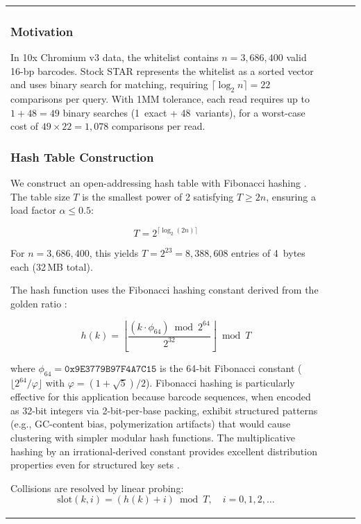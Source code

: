 \documentclass[11pt,twocolumn]{article}
\begin{document}
\begin{table}[t]
\begin{tabular}{@{}lrrr@{}}
\subsubsection{Motivation}

In 10x Chromium v3 data, the whitelist contains $n = 3{,}686{,}400$ valid 16-bp barcodes. Stock STAR represents the whitelist as a sorted vector and uses binary search for matching, requiring $\lceil \log_2 n \rceil = 22$ comparisons per query. With 1MM tolerance, each read requires up to $1 + 48 = 49$ binary searches (1~exact + 48~variants), for a worst-case cost of $49 \times 22 = 1{,}078$ comparisons per read.

\subsubsection{Hash Table Construction}

We construct an open-addressing hash table with Fibonacci hashing \citep{knuth1997art}. The table size $T$ is the smallest power of 2 satisfying $T \geq 2n$, ensuring a load factor $\alpha \leq 0.5$:

\begin{equation}
T = 2^{\lceil \log_2(2n) \rceil}
\label{eq:tablesize}
\end{equation}

For $n = 3{,}686{,}400$, this yields $T = 2^{23} = 8{,}388{,}608$ entries of 4~bytes each (32\,MB total).

The hash function uses the Fibonacci hashing constant derived from the golden ratio \citep{knuth1997art}:

\begin{equation}
h(k) = \left\lfloor \frac{(k \cdot \phi_{64}) \bmod 2^{64}}{2^{32}} \right\rfloor \bmod T
\label{eq:fibhash}
\end{equation}

where $\phi_{64} = \texttt{0x9E3779B97F4A7C15}$ is the 64-bit Fibonacci constant ($\lfloor 2^{64} / \varphi \rfloor$ with $\varphi = (1+\sqrt{5})/2$). Fibonacci hashing is particularly effective for this application because barcode sequences, when encoded as 32-bit integers via 2-bit-per-base packing, exhibit structured patterns (e.g., GC-content bias, polymerization artifacts) that would cause clustering with simpler modular hash functions. The multiplicative hashing by an irrational-derived constant provides excellent distribution properties even for structured key sets \citep{knuth1997art}.

Collisions are resolved by linear probing:
\begin{equation}
\text{slot}(k, i) = (h(k) + i) \bmod T, \quad i = 0, 1, 2, \ldots
\label{eq:probe}
\end{equation}


\end{tabular}
\end{table}
\end{document}

